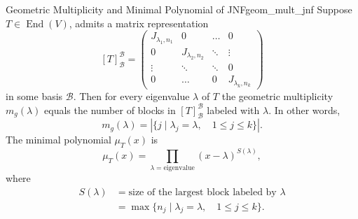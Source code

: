\begin{corollary}{Geometric Multiplicity and Minimal Polynomial of JNF}{geom_mult_jnf}
	Suppose $T \in \operatorname{End}(V)$, admits a matrix representation
	\[
		[T]^{\mathcal{B}}_{\mathcal{B}} = 
		\begin{pmatrix}
			J_{\lambda_1, n_1} & 0 & \hdots & 0\\
			0 & J_{\lambda_2, n_2} & \ddots & \vdots\\
			\vdots & \ddots & \ddots & 0\\
			0 & \hdots & 0 & J_{\lambda_k, n_k}
		\end{pmatrix}
	\]
	in some basis $\mathcal{B}$. Then for every eigenvalue $\lambda$ of $T$ the geometric multiplicity $m_g(\lambda)$ equals the number of blocks in $[T]^{\mathcal{B}}_{\mathcal{B}}$ labeled with $\lambda$. In other words, 
	\[
		m_g(\lambda) = \left|\{j \;|\; \lambda_j = \lambda, \quad 1 \leq j \leq k\}\right|.
	\] 
	The minimal polynomial $\mu_T(x)$ is
	\[
		\mu_T(x) = \prod_{\lambda = \text{eigenvalue}} (x - \lambda)^{S(\lambda)},
	\]
	where 
	\begin{align*}
		S(\lambda) &= \text{size of the largest block labeled by } \lambda\\
		&= \max\{n_j \;|\; \lambda_j = \lambda, \quad 1 \leq j \leq k\}.
	\end{align*}
\end{corollary}
